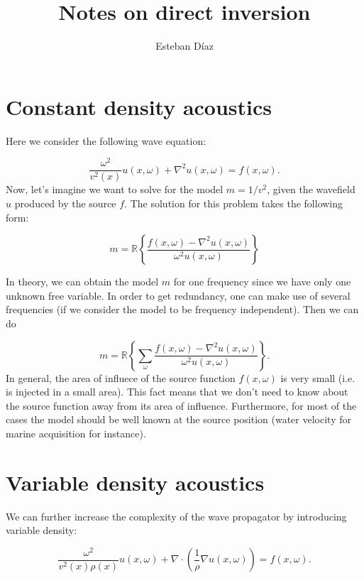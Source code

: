 \documentclass[10pt]{article}
\author{Esteban D\'{i}az}
\title{Notes on direct inversion}{}
\begin{document}
\maketitle


\section{Constant density acoustics}

Here we consider the following wave equation:

\begin{equation}
  \frac{\omega^2 }{v^2(x)} u(x,\omega) +\nabla^2 u(x,\omega) = f(x,\omega).
  \label{eq:cden}
\end{equation}
 Now, let's imagine we want to solve for the model $m = 1/v^2$, given the wavefield $u$ produced
by the source $f$. The solution for this problem takes the following form:

\begin{equation}
   m = \mathbb{R}\left\{ \frac {{f(x,\omega)} - \nabla^2{ u(x,\omega) }}{\omega^2 u(x,\omega)} \right\}
\end{equation}

In theory, we can obtain the model $m$ for one frequency since we have only one unknown free variable.
In order to get redundancy, one can make use of several frequencies (if we consider the model
to be frequency independent). Then we can do

\begin{equation}
   m =  \mathbb{R}\left\{\sum_\omega \frac {{f(x,\omega)} - \nabla^2{ u(x,\omega) }}{\omega^2 u(x,\omega)} \right\}.
\end{equation}
In general, the area of influece of the source function $f(x,\omega)$ is very small (i.e. is injected in a small area). 
 This fact means that we don't need to know about the source function away from its area of influence. Furthermore,
 for most of the cases the model  should be well known at the source position (water velocity for marine acquisition for instance). 


\section{Variable density acoustics}

We can further increase the complexity of the wave propagator by introducing variable density: 

\begin{equation}
  \frac{\omega^2 }{v^2(x) \rho(x)} u(x,\omega) +\nabla \cdot(\frac{1}{\rho} \nabla u(x,\omega)) = f(x,\omega).
  \label{eq:vden}
\end{equation}
\end{document}
